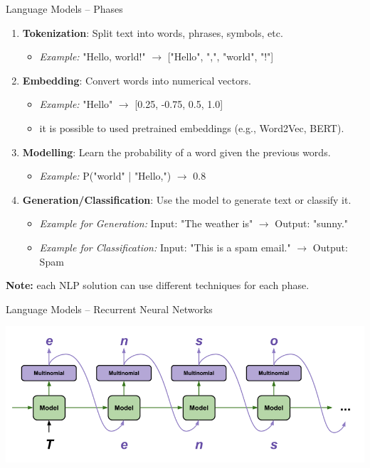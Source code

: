 \documentclass[presentation, 10pt]{beamer}\mode<presentation>{\usetheme{AMSBolognaFC}}
\begin{document}
\begin{frame}{Language Models -- Phases}
    \begin{enumerate}
        \item \textbf{Tokenization}: Split text into words, phrases, symbols, etc. \\
        \begin{itemize}
			\item \textit{Example:} "Hello, world!" $\rightarrow$ ["Hello", ",", "world", "!"]
		\end{itemize}
        \item \textbf{Embedding}: Convert words into numerical vectors.
        \begin{itemize}
			\item \textit{Example:} "Hello" $\rightarrow$ [0.25, -0.75, 0.5, 1.0]
			\item it is possible to used pretrained embeddings (e.g., Word2Vec,  BERT).
		\end{itemize}
        
        \item \textbf{Modelling}: Learn the probability of a word given the previous words.
        \begin{itemize}
			\item \textit{Example:} P("world" | "Hello,") $\rightarrow$ 0.8
		\end{itemize}
        \item \textbf{Generation/Classification}: Use the model to generate text or classify it. \\
        \begin{itemize}
			\item \textit{Example for Generation:} Input: "The weather is" $\rightarrow$ Output: "sunny." \\
			\item     \textit{Example for Classification:} Input: "This is a spam email." $\rightarrow$ Output: Spam
     
		\end{itemize}
    \end{enumerate}
\textbf{Note:} each NLP solution can use different techniques for each phase.
\end{frame}
\begin{frame}[fragile]{Language Models -- Recurrent Neural Networks}

\includegraphics[width=\textwidth]{img/text-generation.png}

\end{frame}
\end{document}

